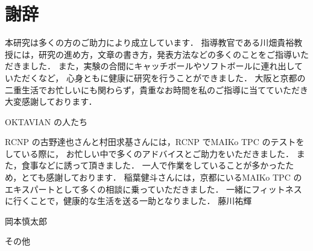 \documentclass[../master]{subfiles}
\begin{document}
\chapter*{謝辞}
本研究は多くの方のご助力により成立しています．
指導教官である川畑貴裕教授には，研究の進め方，文章の書き方，発表方法などの多くのことをご指導いただきました．
また，実験の合間にキャッチボールやソフトボールに連れ出していただくなど，
心身ともに健康に研究を行うことができました．
大阪と京都の二重生活でお忙しいにも関わらず，貴重なお時間を私のご指導に当てていただき大変感謝しております．

OKTAVIAN の人たち

RCNP の古野達也さんと村田求基さんには，RCNP でMAIKo TPC のテストをしている際に，
お忙しい中で多くのアドバイスとご助力をいただきました．
また，食事などに誘って頂きました．
一人で作業をしていることが多かったため，とても感謝しております．
稲葉健斗さんには，京都にいるMAIKo TPC のエキスパートとして多くの相談に乗っていただきました．
一緒にフィットネスに行くことで，健康的な生活を送る一助となりました．
藤川祐輝

岡本慎太郎

その他
\end{document}
